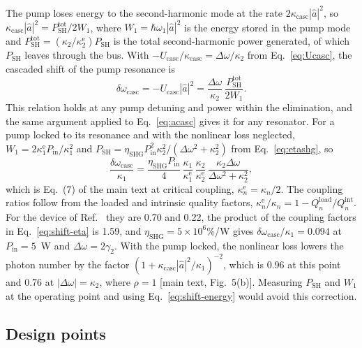 \documentclass[9pt]{osa-supplemental-document}
\newcommand{\Dom}{\Delta\omega}
\begin{document}
The pump loses energy to the second-harmonic mode at the rate
$2\kappa_{\mathrm{casc}}|\hat a|^2$, so
$\kappa_{\mathrm{casc}}|\hat a|^2=P_{\mathrm{SH}}^{\mathrm{tot}}/2W_1$, where
$W_1=\hbar\omega_1|\hat a|^2$ is the energy stored in the pump mode and
$P_{\mathrm{SH}}^{\mathrm{tot}}=(\kappa_2/\kappa_2^{\mathrm e})P_{\mathrm{SH}}$
is the total second-harmonic power generated, of which $P_{\mathrm{SH}}$
leaves through the bus.  With $-U_{\mathrm{casc}}/\kappa_{\mathrm{casc}}=\Dom/\kappa_2$
from Eq.~\eqref{eq:Ucasc}, the cascaded shift of the pump resonance is
\begin{equation}
  \delta\omega_{\mathrm{casc}}=-U_{\mathrm{casc}}|\hat a|^2
  =\frac{\Dom}{\kappa_2}\,\frac{P_{\mathrm{SH}}^{\mathrm{tot}}}{2W_1}.
  \label{eq:shift-energy}
\end{equation}
This relation holds at any pump detuning and power within the
elimination, and the same argument applied to Eq.~\eqref{eq:acasc} gives it
for any resonator.  For a pump locked to its resonance and with the
nonlinear loss neglected,
$W_1=2\kappa_1^{\mathrm e}P_{\mathrm{in}}/\kappa_1^2$ and
$P_{\mathrm{SH}}=\eta_{\mathrm{SHG}}P_{\mathrm{in}}^2\kappa_2^2/(\Dom^2+\kappa_2^2)$
from Eq.~\eqref{eq:etashg}, so
\begin{equation}
  \frac{\delta\omega_{\mathrm{casc}}}{\kappa_1}
  =\frac{\eta_{\mathrm{SHG}}P_{\mathrm{in}}}{4}\,
  \frac{\kappa_1}{\kappa_1^{\mathrm e}}\,\frac{\kappa_2}{\kappa_2^{\mathrm e}}\,
  \frac{\kappa_2\Dom}{\Dom^2+\kappa_2^2},
  \label{eq:shift-eta}
\end{equation}
which is Eq.~(7) of the main text at critical coupling,
$\kappa_n^{\mathrm e}=\kappa_n/2$.  The coupling ratios follow from the
loaded and intrinsic quality factors,
$\kappa_n^{\mathrm e}/\kappa_n=1-Q_n^{\mathrm{load}}/Q_n^{\mathrm{int}}$.  For
the device of Ref.~\cite{lu2020} they are 0.70 and 0.22, the product of the
coupling factors in Eq.~\eqref{eq:shift-eta} is 1.59, and
$\eta_{\mathrm{SHG}}=5\times10^6$\%/W gives
$\delta\omega_{\mathrm{casc}}/\kappa_1=0.094$ at $P_{\mathrm{in}}=5$~\textmu W
and $\Dom=2\gamma_2$.  With the pump locked, the nonlinear loss lowers the
photon number by the factor
$(1+\kappa_{\mathrm{casc}}|\hat a|^2/\kappa_1)^{-2}$, which is 0.96 at this
point and 0.76 at $|\Dom|=\kappa_2$, where $\rho=1$ [main text,
Fig.~5(b)].  Measuring $P_{\mathrm{SH}}$ and $W_1$ at the operating point and
using Eq.~\eqref{eq:shift-energy} would avoid this correction.

\subsection{Design points}
\end{document}
